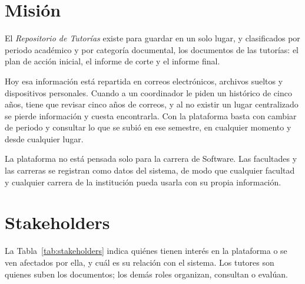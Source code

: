 
\section{Misión}

El \textit{Repositorio de Tutorías} existe para guardar en un solo lugar, y clasificados
por periodo académico y por categoría documental, los documentos de las tutorías: el plan
de acción inicial, el informe de corte y el informe final.

Hoy esa información está repartida en correos electrónicos, archivos sueltos y
dispositivos personales. Cuando a un coordinador le piden un histórico de cinco años,
tiene que revisar cinco años de correos, y al no existir un lugar centralizado se pierde
información y cuesta encontrarla. Con la plataforma basta con cambiar de periodo y
consultar lo que se subió en ese semestre, en cualquier momento y desde cualquier lugar.

La plataforma no está pensada solo para la carrera de Software. Las facultades y las
carreras se registran como datos del sistema, de modo que cualquier facultad y cualquier
carrera de la institución pueda usarla con su propia información.

\section{Stakeholders}

La Tabla~\ref{tab:stakeholders} indica quiénes tienen interés en la plataforma o se ven
afectados por ella, y cuál es su relación con el sistema. Los tutores son quienes suben
los documentos; los demás roles organizan, consultan o evalúan.

